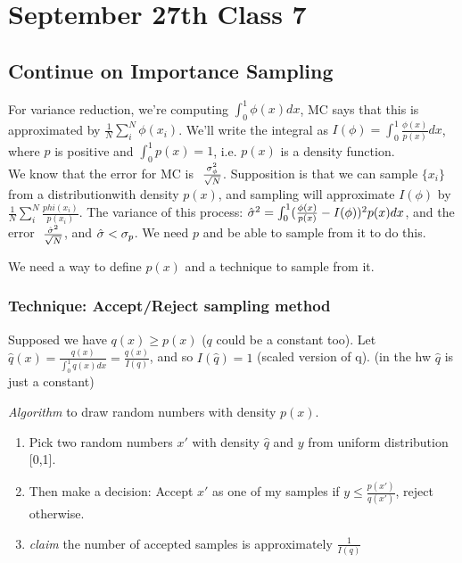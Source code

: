 \pagebreak{}
\section{September 27th Class 7}
\label{sec:class7}

\subsection{Continue on Importance Sampling}
\label{sec:importancesampling}

For variance reduction, we're computing $\int_0^1\phi(x) dx$, MC says
that this is approximated by $\frac{1}{N}\sum_i^N\phi(x_i)$. We'll write the
integral as $I(\phi) = \int_0^1\frac{\phi(x)}{p(x)}dx$, where $p$ is
positive and $\int_0^1p(x) = 1$, i.e. $p(x)$ is a density function.\\

We know that the error for MC is
$~\frac{\sigma_{\phi}^2}{\sqrt{N}}$. Supposition is that we can sample
$\{x_i\}$ from a distributionwith density $p(x)$, and sampling will
approximate $I(\phi)$ by
$\frac{1}{N}\sum_i^N\frac{phi(x_i)}{p(x_i)}$. The variance of this
process: $\hat {\sigma}^2 = \int_0^1(\frac{\phi(x)}{p(x)} -
I(\phi))^2p(x)dx$, and the error $~ \frac{\hat {\sigma}^2}{\sqrt{N}}$, and
$\hat {\sigma} < \sigma_p$. We need $p$ and be able to sample from it to do
this.


We need a way to define $p(x)$ and a technique to sample from it. 

\subsubsection{Technique: Accept/Reject sampling method}
Supposed we have $q(x)\ge p(x)$ ($q$ could be a constant too).
Let $\hat q(x)= \frac{q(x)}{\int_0^1q(x)dx} = \frac{q(x)}{I(q)}$, and
so $I(\hat q) = 1$ (scaled version of q). (in the hw $\hat q$ is just
a constant)

\emph{Algorithm} to draw random numbers with density $p(x)$. 
\begin{enumerate}
\item Pick two random numbers $x'$ with density $\hat q$ and $y$ from
  uniform distribution [0,1].
\item Then make a decision: Accept $x'$ as one of my samples if $y\le \frac{p(x')}{q(x')}$,
  reject otherwise.
\item \emph{claim} the number of accepted samples is approximately $\frac{1}{I(q)}$
\end{enumerate}

